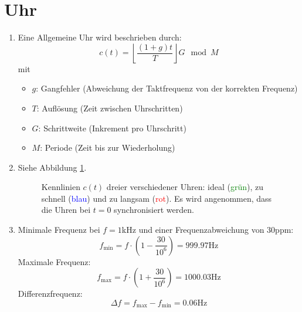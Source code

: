 \documentclass[DIN, pagenumber=false, fontsize=11pt, parskip=half]{scrartcl}
\begin{document}
    \section{Uhr} 
    \begin{enumerate}[label=\alph*)]
        \item
            Eine Allgemeine Uhr wird beschrieben durch:
            \begin{equation}
                c(t) = \left\lfloor \frac{(1+g) t}{T} \right\rfloor G \mod M
            \end{equation}
            mit
            \begin{itemize}
                \item $g$: Gangfehler (Abweichung der Taktfrequenz von der korrekten
                    Frequenz)
                \item $T$: Auflösung (Zeit zwischen Uhrschritten)
                \item $G$: Schrittweite (Inkrement pro Uhrschritt)
                \item $M$: Periode (Zeit bis zur Wiederholung)
            \end{itemize}
        \item 
            Siehe Abbildung \ref{fig:kennlinien}.
            \begin{figure}[h]
                \centering
                \caption{Kennlinien $c(t)$ dreier verschiedener Uhren:
                    ideal (\textcolor{green}{grün}), zu schnell (\textcolor{blue}{blau}) 
                    und zu langsam (\textcolor{red}{rot}).
                    Es wird angenommen, dass die Uhren bei $t=0$ synchronisiert werden.}
                \label{fig:kennlinien}
            \end{figure}
        \item Minimale Frequenz bei $f=1$kHz und einer Frequenzabweichung von $30$ppm:
            \begin{equation}
                f_\text{min} = f \cdot \left(1 - \frac{30}{{10}^6}\right) = 999.97\text{Hz}
            \end{equation}
            Maximale Frequenz:
            \begin{equation}
                f_\text{max} = f \cdot \left(1 + \frac{30}{{10}^6}\right) = 1000.03\text{Hz}
            \end{equation}
            Differenzfrequenz:
            \begin{equation}
                \Delta f = f_\text{max} - f_\text{min} = 0.06 \text{Hz}
            \end{equation}


\end{enumerate}
\end{document}
